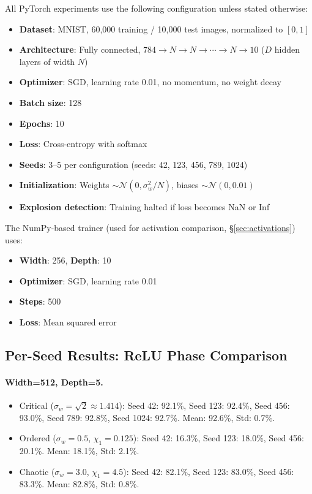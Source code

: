 \documentclass[10pt]{article}
\begin{document}
All PyTorch experiments use the following configuration unless stated otherwise:
\begin{itemize}[nosep]
    \item \textbf{Dataset}: MNIST, 60,000 training / 10,000 test images, normalized to $[0,1]$
    \item \textbf{Architecture}: Fully connected, $784 \to N \to N \to \cdots \to N \to 10$ ($D$ hidden layers of width $N$)
    \item \textbf{Optimizer}: SGD, learning rate 0.01, no momentum, no weight decay
    \item \textbf{Batch size}: 128
    \item \textbf{Epochs}: 10
    \item \textbf{Loss}: Cross-entropy with softmax
    \item \textbf{Seeds}: 3--5 per configuration (seeds: 42, 123, 456, 789, 1024)
    \item \textbf{Initialization}: Weights $\sim \mathcal{N}(0, \sigma_w^2/N)$, biases $\sim \mathcal{N}(0, 0.01)$
    \item \textbf{Explosion detection}: Training halted if loss becomes NaN or Inf
\end{itemize}

The NumPy-based trainer (used for activation comparison, \S\ref{sec:activations}) uses:
\begin{itemize}[nosep]
    \item \textbf{Width}: 256, \textbf{Depth}: 10
    \item \textbf{Optimizer}: SGD, learning rate 0.01
    \item \textbf{Steps}: 500
    \item \textbf{Loss}: Mean squared error
\end{itemize}

\subsection{Per-Seed Results: ReLU Phase Comparison}

\paragraph{Width=512, Depth=5.}
\begin{itemize}[nosep]
    \item Critical ($\sigma_w = \sqrt{2} \approx 1.414$):
    Seed 42: 92.1\%, Seed 123: 92.4\%, Seed 456: 93.0\%, Seed 789: 92.8\%, Seed 1024: 92.7\%.
    Mean: 92.6\%, Std: 0.7\%.
    \item Ordered ($\sigma_w = 0.5$, $\chi_1 = 0.125$):
    Seed 42: 16.3\%, Seed 123: 18.0\%, Seed 456: 20.1\%.
    Mean: 18.1\%, Std: 2.1\%.
    \item Chaotic ($\sigma_w = 3.0$, $\chi_1 = 4.5$):
    Seed 42: 82.1\%, Seed 123: 83.0\%, Seed 456: 83.3\%.
    Mean: 82.8\%, Std: 0.8\%.
\end{itemize}
\end{document}
